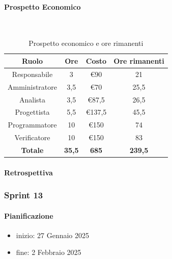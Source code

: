 \documentclass{article}
\begin{document}
                \paragraph{Prospetto Economico}\mbox{}\\
                \begin{table}[H]
                    \centering
                    \begin{tabular}{|c|c|c|c|}
                    \hline
                    \textbf{Ruolo}  & \textbf{Ore}  & \textbf{Costo} & \textbf{Ore rimanenti} \\ \hline
                    Responsabile    & 3             & €90            & 21                     \\ \hline
                    Amministratore  & 3,5           & €70            & 25,5                   \\ \hline
                    Analista        & 3,5           & €87,5          & 26,5                   \\ \hline
                    Progettista     & 5,5           & €137,5         & 45,5                   \\ \hline
                    Programmatore   & 10            & €150           & 74                     \\ \hline
                    Verificatore    & 10            & €150           & 83                     \\ \hline
                    \textbf{Totale} & \textbf{35,5} & \textbf{685}   & \textbf{239,5}         \\ \hline
                    \end{tabular}
                    \caption{Prospetto economico e ore rimanenti}
                \end{table}

                \paragraph{Retrospettiva}
            \subsubsection{Sprint 13}
                \paragraph{Pianificazione}
                \begin{itemize}
                    \item inizio: 27 Gennaio 2025
                    \item fine: 2 Febbraio 2025
                \end{itemize}
\end{document}
